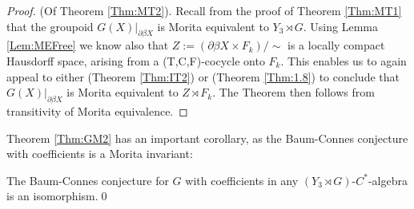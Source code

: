 \begin{proof}(Of Theorem \ref{Thm:MT2}).
Recall from the proof of Theorem \ref{Thm:MT1} that the groupoid $G(X)|_{\partial\beta X}$ is Morita equivalent to $Y_{3}\rtimes G$. Using Lemma \ref{Lem:MEFree} we know also that $Z:=(\partial\beta X \times F_{k} )/\sim$ is a locally compact Hausdorff space, arising from a (T,C,F)-cocycle onto $F_{k}$. This enables us to again appeal to either \cite[Theorem 6.14]{Milan-Steinberg} (Theorem \ref{Thm:IT2}) or \cite[Theorem 1.8]{MR1900993} (Theorem \ref{Thm:1.8}) to conclude that $G(X)|_{\partial\beta X}$ is Morita equivalent to $Z\rtimes F_{k}$. The Theorem then follows from transitivity of Morita equivalence.
\end{proof}

Theorem \ref{Thm:GM2} has an important corollary, as the Baum-Connes conjecture with coefficients is a Morita invariant:

\begin{corollary}
The Baum-Connes conjecture for $G$ with coefficients in any $(Y_{3}\rtimes G)$-$C^{*}$-algebra is an isomorphism.\qed
\end{corollary}